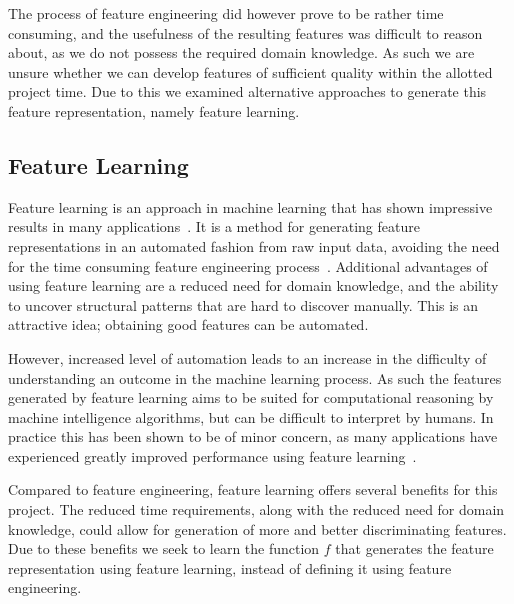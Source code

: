The process of feature engineering did however prove to be rather time consuming, and the usefulness of the resulting features was difficult to reason about, as we do not possess the required domain knowledge. As such we are unsure whether we can develop features of sufficient quality within the allotted project time. Due to this we examined alternative approaches to generate this feature representation, namely feature learning.

\subsection{Feature Learning}
Feature learning is an approach in machine learning that has shown impressive results in many applications~\cite{bengio2013representation}. It is a method for generating feature representations in an automated fashion from raw input data, avoiding the need for the time consuming feature engineering process~\cite{ng-lecture}. Additional advantages of using feature learning are a reduced need for domain knowledge, and the ability to uncover structural patterns that are hard to discover manually. This is an attractive idea; obtaining good features can be automated.

However, increased level of automation leads to an increase in the difficulty of understanding an outcome in the machine learning process. As such the features generated by feature learning aims to be suited for computational reasoning by machine intelligence algorithms, but can be difficult to interpret by humans. In practice this has been shown to be of minor concern, as many applications have experienced greatly improved performance using feature learning~\cite{bengio2013representation}.


Compared to feature engineering, feature learning offers several benefits for this project. The reduced time requirements, along with the reduced need for domain knowledge, could allow for generation of more and better discriminating features. Due to these benefits we seek to learn the function $f$ that generates the feature representation using feature learning, instead of defining it using feature engineering.
